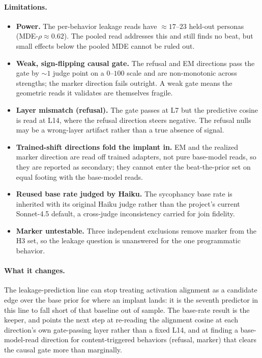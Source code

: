 \documentclass[11pt]{article}
\begin{document}
\paragraph{Limitations.}
\begin{itemize}[leftmargin=1.4em,topsep=2pt,itemsep=2pt]
  \item \textbf{Power.} The per-behavior leakage reads have $\approx 17$--$23$
  held-out personas (MDE-$\rho \approx 0.62$). The pooled read addresses this and
  still finds no beat, but small effects below the pooled MDE cannot be ruled out.
  \item \textbf{Weak, sign-flipping causal gate.} The refusal and EM directions
  pass the gate by $\sim1$ judge point on a $0$--$100$ scale and are non-monotonic
  across strengths; the marker direction fails outright. A weak gate means the
  geometric reads it validates are themselves fragile.
  \item \textbf{Layer mismatch (refusal).} The gate passes at L7 but the predictive
  cosine is read at L14, where the refusal direction steers negative. The refusal
  nulls may be a wrong-layer artifact rather than a true absence of signal.
  \item \textbf{Trained-shift directions fold the implant in.} EM and the realized
  marker direction are read off trained adapters, not pure base-model reads, so they
  are reported as secondary; they cannot enter the beat-the-prior set on equal
  footing with the base-model reads.
  \item \textbf{Reused base rate judged by Haiku.} The sycophancy base rate is
  inherited with its original Haiku judge rather than the project's current
  Sonnet-4.5 default, a cross-judge inconsistency carried for join fidelity.
  \item \textbf{Marker untestable.} Three independent exclusions remove marker from
  the H3 set, so the leakage question is unanswered for the one programmatic
  behavior.
\end{itemize}

\paragraph{What it changes.}
The leakage-prediction line can stop treating activation alignment as a candidate
edge over the base prior for where an implant lands: it is the seventh predictor in
this line to fall short of that baseline out of sample. The base-rate result is the
keeper, and points the next step at re-reading the alignment cosine at each
direction's own gate-passing layer rather than a fixed L14, and at finding a
base-model-read direction for content-triggered behaviors (refusal, marker) that
clears the causal gate more than marginally.
\end{document}
